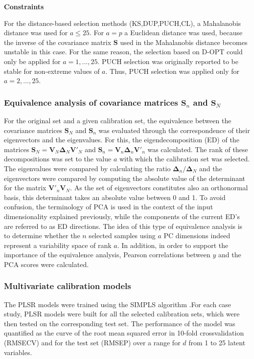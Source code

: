 \documentclass[preprint,12pt]{elsarticle}
\begin{document}
\textbf{Constraints}

For the distance-based selection methods (KS,DUP,PUCH,CL), a Mahalanobis distance was used for $a\le 25$.  For $a=p$ a Euclidean distance was used, because the inverse of the covariance matrix $\mathbf{S}$ used in the Mahalanobis distance becomes unstable in this case. For the same reason, the selection based on D-OPT could only be applied for $a=1,...,25$. PUCH selection was originally reported to be stable for non-extreme values of $a$\cite{Puchwein1988}. Thus, PUCH selection was applied only for $a=2,...,25$.


\subsubsection{Equivalence analysis of covariance matrices $\mathbf{S}_n$ and $\mathbf{S}_N$}

For the original set and a given calibration set, the equivalence between the covariance matrices $\mathbf{S}_N$ and $\mathbf{S}_n$ was evaluated through the correspondence of their eigenvectors and the eigenvalues. For this, the eigendecomposition (ED) of the matrices $\mathbf{S}_N = \mathbf{V}_N \mathbf{\Delta}_N \mathbf{V}'_N$ and $\mathbf{S}_n = \mathbf{V}_n \mathbf{\Delta}_n \mathbf{V}'_n$ was calculated. The rank of these decompositions was set to the value $a$ with which the calibration set was selected. The eigenvalues were compared by calculating the ratio  $\mathbf{\Delta}_n/\mathbf{\Delta}_N$ and the eigenvectors were compared by computing the absolute value of the determinant for the matrix $\mathbf{V}'_n\mathbf{V}_N$. As the set of eigenvectors constitutes also an orthonormal basis, this determinant takes an absolute value between 0 and 1. To avoid confusion, the terminology of PCA is used in the context of the input dimensionality explained previously, while the components of the current ED's are referred to as ED directions. The idea of this type of equivalence analysis is to determine whether the $n$ selected samples using $a$ PC dimensions indeed represent a variability space of rank $a$. In addition, in order to support the importance of the equivalence analysis, Pearson correlations between $y$ and the PCA scores were calculated.

\subsubsection{Multivariate calibration models}

The PLSR models were trained using the SIMPLS algorithm \cite{DeJong1993}.For each case study, PLSR models were built for all the selected calibration sets, which were then tested on the corresponding test set. The performance of the model was quantified as the curve of the root mean squared error in 10-fold crossvalidation (RMSECV) and for the test set (RMSEP) over a range for $d$ from 1 to 25 latent variables. 
\end{document}
